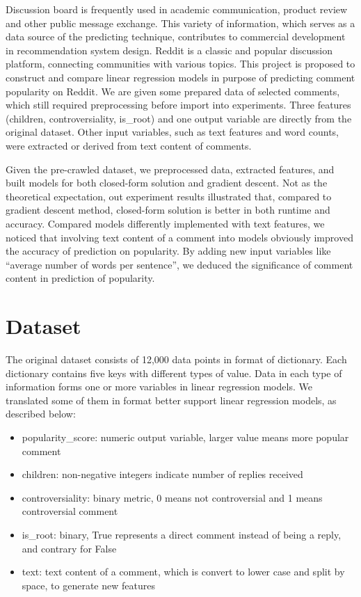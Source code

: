 \documentclass[letterpaper, 11pt]{article}
\begin{document}
Discussion board is frequently used in academic communication, product review and other public message exchange. This variety of information, which serves as a data source of the predicting technique, contributes to commercial development in recommendation system design\cite{rohlin2016popularity}. Reddit is a classic and popular discussion platform, connecting communities with various topics. This project is proposed to construct and compare linear regression models in purpose of predicting comment popularity on Reddit. We are given some prepared data of selected comments, which still required preprocessing before import into experiments. Three features (children, controversiality, is\_root) and one output variable are directly from the original dataset. Other input variables, such as text features and word counts, were extracted or derived from text content of comments.

Given the pre-crawled dataset, we preprocessed data, extracted features, and built models for both closed-form solution and gradient descent. Not as the theoretical expectation, out experiment results illustrated that, compared to gradient descent method, closed-form solution is better in both runtime and accuracy. Compared models differently implemented with text features, we noticed that involving text content of a comment into models obviously improved the accuracy of prediction on popularity. By adding new input variables like ``average number of words per sentence'', we deduced the significance of comment content in prediction of popularity.

\section*{Dataset}

The original dataset consists of 12,000 data points in format of dictionary. Each dictionary contains five keys with different types of value. Data in each type of information forms one or more variables in linear regression models. We translated some of them in format better support linear regression models, as described below:

\begin{itemize}
    \item popularity\_score: numeric output variable, larger value means more popular comment
    \item children: non-negative integers indicate number of replies received
    \item controversiality: binary metric, 0 means not controversial and 1 means controversial comment
    \item is\_root: binary, True represents a direct comment instead of being a reply, and contrary for False
    \item text: text content of a comment, which is convert to lower case and split by space, to generate new features
\end{itemize}
\end{document}
